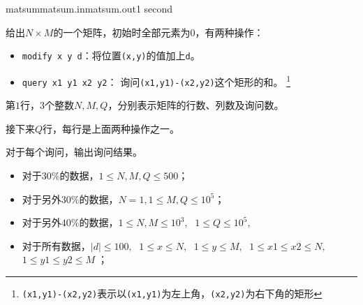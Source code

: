 \documentclass[11pt,a4paper,oneside]{article}
\begin{document}
\begin{problem}{matsum}{matsum.in}{matsum.out}{1 second} 

    给出$N \times M$的一个矩阵，初始时全部元素为$0$，有两种操作：
    \begin{itemize}
    	\item \texttt{modify x y d}：将位置\texttt{(x,y)}的值加上\texttt{d}。
    	\item \texttt{query x1 y1 x2 y2}： 询问\texttt{(x1,y1)-(x2,y2)}这个矩形的和。
    	\footnote{\texttt{(x1,y1)-(x2,y2)}表示以\texttt{(x1,y1)}为左上角，\texttt{(x2,y2)}为右下角的矩形}
    \end{itemize}

    \InputFile

    第$1$行，$3$个整数$N, M, Q$，分别表示矩阵的行数、列数及询问数。
    
    接下来$Q$行，每行是上面两种操作之一。

    \OutputFile

    对于每个询问，输出询问结果。

    \Example

    \begin{example}
    \end{example}

    \Note
    
    \begin{itemize}
		\item 对于$30\%$的数据，$1 \leq N, M, Q \leq 500$；
        \item 对于另外$30\%$的数据，$N = 1, 1 \leq M, Q \leq 10^5$；
        \item 对于另外$40\%$的数据，$1 \leq N, M \leq 10^3, \; $ $1 \leq Q \leq 10^5,\; $
        \item 对于所有数据，$ |d| \leq 100, \; $ $1 \leq x \leq N,\; $ $1 \leq y \leq M,\;$ $ 1 \leq x1 \leq x2 \leq N,\;$ 
		        $ 1 \leq y1 \leq y2 \leq M\;$；
    \end{itemize}

\end{problem}
\end{document}

